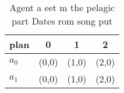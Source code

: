 \documentclass[a4paper]{article}
\begin{document}
\begin{table}
\begin{adjustbox}{width=0.5\columnwidth}
\begin{tabular}{|l|l|l|l|}
\hline
\textbf{plan} & \multicolumn{1}{c|}{\textbf{0}} & \multicolumn{1}{c|}{\textbf{1}} & \multicolumn{1}{c|}{\textbf{2}} \\ \hline
\textbf{$a_0$}  & (0,0) & (1,0) & (2,0) \\ \hline
\textbf{$a_1$}  & (0,0) & (1,0) & (2,0) \\ \hline
\end{tabular}
\end{adjustbox}
\caption{Agent a eet m the pelagic part Dates rom song put
}
\end{table}
\end{document}
